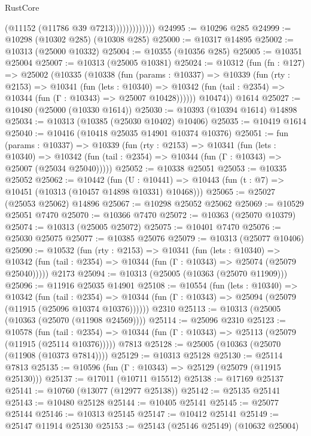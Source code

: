 \begin{lexlean}{RustCore}
\begin{coremodule}
                          (@11152 (@11786 @39 @7213)))))))))))))
@24995 := @10296 @285
@24999 := @10298 (@10302 @285) (@10308 @285)
@25000 := @10317 @14895
@25002 := @10313 (@25000 @10332)
@25004 := @10355 (@10356 @285)
@25005 := @10351 @25004
@25007 := @10313 (@25005 @10381)
@25024 := @10312
    (fun (fn : @127) =>
    @25002
      (@10335
        (@10338
          (fun (params : @10337) =>
          @10339
            (fun (rty : @2153) =>
            @10341
              (fun (lets : @10340) =>
              @10342 (fun (tail : @2354) => @10344 (fun (Γ : @10343) => @25007 @10428))))))
        @10474))
    @1614
@25027 := @10480 (@25000 (@10330 @1614))
@25030 := @10393 (@10394 @1614) @14898
@25034 := @10313 (@10385 (@25030 @10402) @10406)
@25035 := @10419 @1614
@25040 := @10416 (@10418 @25035 @14901 @10374 @10376)
@25051 := fun (params : @10337) =>
  @10339
    (fun (rty : @2153) =>
    @10341
      (fun (lets : @10340) =>
      @10342 (fun (tail : @2354) => @10344 (fun (Γ : @10343) => @25007 (@25034 @25040)))))
@25052 := @10338 @25051
@25053 := @10335 @25052
@25062 := @10442
    (fun (U : @10441) => @10443 (fun (t : @7) => @10451 (@10313 (@10457 @14898 @10331) @10468)))
@25065 := @25027 (@25053 @25062) @14896
@25067 := @10298 @25052 @25062
@25069 := @10529 @25051 @7470
@25070 := @10366 @7470
@25072 := @10363 (@25070 @10379)
@25074 := @10313 (@25005 @25072)
@25075 := @10401 @7470
@25076 := @25030 @25075
@25077 := @10385 @25076
@25079 := @10313 (@25077 @10406)
@25090 := @10532
    (fun (rty : @2153) =>
    @10341
      (fun (lets : @10340) =>
      @10342 (fun (tail : @2354) => @10344 (fun (Γ : @10343) => @25074 (@25079 @25040)))))
    @2173
@25094 := @10313 (@25005 (@10363 (@25070 @11909)))
@25096 := @11916 @25035 @14901
@25108 := @10554
    (fun (lets : @10340) =>
    @10342
      (fun (tail : @2354) =>
      @10344 (fun (Γ : @10343) => @25094 (@25079 (@11915 (@25096 @10374 @10376))))))
    @2310
@25113 := @10313 (@25005 (@10363 (@25070 (@11908 @24569))))
@25114 := @25096 @2310
@25123 := @10578
    (fun (tail : @2354) => @10344 (fun (Γ : @10343) => @25113 (@25079 (@11915 (@25114 @10376)))))
    @7813
@25128 := @25005 (@10363 (@25070 (@11908 (@10373 @7814))))
@25129 := @10313 @25128
@25130 := @25114 @7813
@25135 := @10596 (fun (Γ : @10343) => @25129 (@25079 (@11915 @25130)))
@25137 := @17011 (@10711 @15512)
@25138 := @17169 @25137
@25141 := @10760 (@13077 (@12977 @25138))
@25142 := @25135 @25141
@25143 := @10480 @25128
@25144 := @10405 @25141
@25145 := @25077 @25144
@25146 := @10313 @25145
@25147 := @10412 @25141
@25149 := @25147 @11914 @25130
@25153 := @25143 (@25146 @25149) (@10632 @25004)

\end{coremodule}
\end{lexlean}
